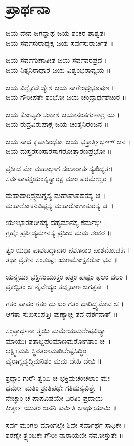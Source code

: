\section{ಪ್ರಾರ್ಥನಾ}
ಜಯ ದೇವ ಜಗನ್ನಾಥ ಜಯ ಶಂಕರ ಶಾಶ್ವತ।\\ ಜಯ ಸರ್ವಸುರಾಧ್ಯಕ್ಷ  ಜಯ ಸರ್ವಸುರಾರ್ಚಿತ ॥

ಜಯ ಸರ್ವಗುಣಾತೀತ ಜಯ ಸರ್ವವರಪ್ರದ ।\\ ಜಯ ನಿತ್ಯನಿರಾಧಾರ ಜಯ ವಿಶ್ವಂಭರಾವ್ಯಯ ॥

ಜಯ ವಿಶ್ವೈಕವೇದ್ಯೇಶ  ಜಯ ನಾಗೇಂದ್ರಭೂಷಣ ।\\ ಜಯ ಗೌರೀಪತೇ ಶಂಭೋ ಜಯ ಚಂದ್ರಾರ್ಧಶೇಖರ ॥

ಜಯ ಕೋಟ್ಯರ್ಕಸಂಕಾಶ ಜಯಾನಂತಗುಣಾಶ್ರ ಯ ।\\ ಜಯ ರುದ್ರವಿರುಪಾಕ್ಷ  ಜಯ ಚಿಂತ್ಯನಿರಂಜನ ॥

ಜಯ ನಾಥ ಕೃಪಾಸಿಂಧೋ ಜಯ ಭಕ್ತಾರ್ತ್ತಿಭಞ್ ಜನ ।\\ ಜಯ ದುಸ್ತರಸಂಸಾರಸಾಗರೋತ್ತಾರಣಪ್ರಭೋ ॥

ಪ್ರಸೀದ ಮೇ ಮಹಾಭಾಗ ಸಂಸಾರಾರ್ತಸ್ಯಖಿದ್ಯತ:।\\ ಸರ್ವಪಾಪಕ್ಷಯಂಕೃತ್ವಾರಕ್ಷ ಮಾಂ ಪರಮೇಶ್ವರ ॥

ಮಹಾದಾರಿದ್ರ್ಯಮಗ್ನಸ್ಯ ಮಹಾಪಾಪಹತಸ್ಯ ಚ ।\\ ಮಹಾಶೋಕನಿವಿಷ್ಟಸ್ಯ ಮಹಾರೋಗಾತುರಸ್ಯ ಚ ॥

ಋಣಭಾರಪರೀತಸ್ಯ ದಹ್ಯಮಾನಸ್ಯ ಕರ್ಮಭಿಃ ।\\ ಗ್ರಹೈಃ ಪ್ರಪೀಡ್ಯಮಾನಸ್ಯ ಪ್ರಸೀದ ಮಮ ಶಂಕರ ॥

ತ್ವಂ ಯಥಾ ಪಾಶಬದ್ಧಾನಾಂ ಪಶೂನಾಂ ಪಾಶಮೋಚಕಃ ।\\ ತಥಾ ವ್ರತೇನ ಸಂತುಷ್ಟಃ ಋಣಮೋಕ್ಷಕರೋ ಭವ ॥

ಯನ್ಮಯಾ ಭಕ್ತಿಸಂಯುಕ್ತಂ ಪತ್ರಂ ಪುಷ್ಪಂ ಫಲಂ ದಲಂ ।\\ ಪ್ರಕಲ್ಪಿತಂ ಚ ನೈವೇದ್ಯಂ ತದ್ಗೃಹಾಣ ಜಗತ್ಪತೇ ॥

ಗತಂ ಪಾಪಂ ಗತಂ ದುಃಖಂ ಗತಂ ದಾರಿದ್ರ್ಯಮೇವ ಚ ।\\ ಆಗತಾ ಸುಖಸಂಪತ್ತಿಃ ಪುಣ್ಯಾಚ್ಚ ತವ ದರ್ಶನಾತ್ ॥

ಸಂಪ್ರಾರ್ಥನಾ ತ್ವಯಿ ಮಮೇಯಮಶೇಷವಿದ್ಯಾ\-\\ಮಾಯುಃ ಶತಾಬ್ದಪರಿಮಾಣಮರೋಗತಾಂ ಚ~।\\
ಲಕ್ಷ್ಮೀಮಪಿ ಸ್ಥಿರತರಾಮಖಿಲೇಷ್ಟಸಿದ್ಧಿಂ \\ವೈರಾಗ್ಯವೃದ್ಧಿಮನಿಶಂ ಮಮ ದೇಹಿ ದೇವಿ ॥

ಶ್ರದ್ಧಾಂ ಗುರೌ ತ್ವಯಿ ಚ ಭಕ್ತಿಮಚಂಚಲಾಂ ಮೇ \\ಧರ್ಮೇ ಮತಿಂ ಶ್ರುತಿಪಥೇ ಗತಿಮನ್ಯವಿತ್ತೇ~।\\
ನೇಚ್ಛಾಂ ಚ ಪಾಪವಿಷಯೇ ವಿರತಿಂ ಪ್ರದಾಯ \\ಕೀರ್ತ್ಯಾ ಯುತಂ ಜನನಿ ಕುರ್ವಿತಿ ಚಾರ್ಥಯಾಮಿ ॥

ಸರ್ವ ಮಂಗಲ ಮಾಂಗಲ್ಯೇ ಶಿವೇ ಸರ್ವಾರ್ಥ ಸಾಧಿಕೇ ।\\ ಶರಣ್ಯೇ ತ್ರ್ಯಂಬಕೇ ಗೌರೀ ನಾರಾಯಣೀ ನಮೋಸ್ತುತೇ ॥

